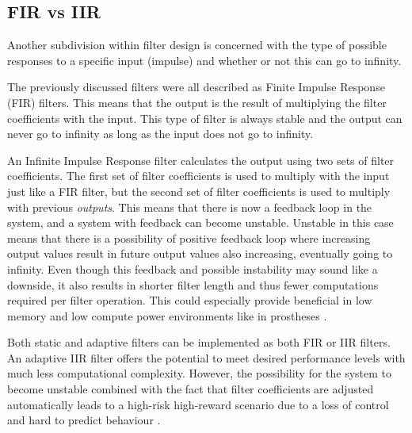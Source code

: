 \subsection{FIR vs IIR}
Another subdivision within filter design is concerned with the type of possible responses to a specific input (impulse) and whether or not this can go to infinity.

The previously discussed filters were all described as Finite Impulse Response (FIR) filters. This means that the output is the result of multiplying the filter coefficients with the input. This type of filter is always stable and the output can never go to infinity as long as the input does not go to infinity.

An Infinite Impulse Response filter calculates the output using two sets of filter coefficients. The first set of filter coefficients is used to multiply with the input just like a FIR filter, but the second set of filter coefficients is used to multiply with previous \textit{outputs}. This means that there is now a feedback loop in the system, and a system with feedback can become unstable. Unstable in this case means that there is a possibility of positive feedback loop where increasing output values result in future output values also increasing, eventually going to infinity. Even though this feedback and possible instability may sound like a downside, it also results in shorter filter length and thus fewer computations required per filter operation. This could especially provide beneficial in low memory and low compute power environments like in prostheses \cite{fir_vs_iir}.

Both static and adaptive filters can be implemented as both FIR or IIR filters. An adaptive IIR filter offers the potential to meet desired performance levels with much less computational complexity. However, the possibility for the system to become unstable combined with the fact that filter coefficients are adjusted automatically leads to a high-risk high-reward scenario due to a loss of control and hard to predict behaviour \cite{digital_signal_processing_handbook}.

